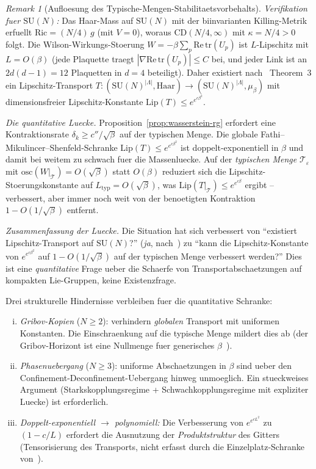 \documentclass[12pt,a4paper]{article}
\theoremstyle{definition}
\theoremstyle{plain}
\theoremstyle{remark}
\newtheorem{remark}[definition]{Remark}
\begin{document}
\begin{remark}[Aufloesung des Typische-Mengen-Stabilitaetsvorbehalts]
\emph{Verifikation fuer $\mathrm{SU}(N)$:}
Das Haar-Mass auf $\mathrm{SU}(N)$ mit der biinvarianten Killing-Metrik
erfuellt $\mathrm{Ric} = (N/4)\,g$ (mit $V = 0$),
woraus $\mathrm{CD}(N/4, \infty)$ mit $\kappa = N/4 > 0$ folgt.
Die Wilson-Wirkungs-Stoerung $W = -\beta\sum_p \mathrm{Re}\,\mathrm{tr}(U_p)$
ist $L$-Lipschitz mit $L = O(\beta)$ (jede Plaquette traegt
$|\nabla \mathrm{Re}\,\mathrm{tr}(U_p)| \leq C$ bei, und jeder Link
ist an $2d(d-1) = 12$ Plaquetten in $d=4$ beteiligt).
Daher existiert nach~\cite{FathiMikulincerShenfeld2024} Theorem~3
ein Lipschitz-Transport $T: (\mathrm{SU}(N)^{|\Lambda|}, \text{Haar})
\to (\mathrm{SU}(N)^{|\Lambda|}, \mu_\beta)$ mit
dimensionsfreier Lipschitz-Konstante $\mathrm{Lip}(T) \leq e^{e^{c\beta^2}}$.

\emph{Die quantitative Luecke.}
Proposition~\ref{prop:wasserstein-rg} erfordert eine Kontraktionsrate
$\delta_k \geq c''/\sqrt{\beta}$ auf der typischen Menge.  Die globale
Fathi--Mikulincer--Shenfeld-Schranke $\mathrm{Lip}(T) \leq e^{e^{c\beta^2}}$
ist doppelt-exponentiell in $\beta$ und damit bei weitem zu schwach fuer die Massenluecke.
Auf der \emph{typischen Menge} $\mathcal{T}_\varepsilon$ mit
$\mathrm{osc}(W|_{\mathcal{T}}) = O(\sqrt{\beta})$ statt $O(\beta)$
reduziert sich die Lipschitz-Stoerungskonstante auf $L_{\mathrm{typ}} = O(\sqrt{\beta})$,
was $\mathrm{Lip}(T|_{\mathcal{T}}) \leq e^{e^{c\beta}}$ ergibt -- verbessert,
aber immer noch weit von der benoetigten Kontraktion $1 - O(1/\sqrt{\beta})$ entfernt.

\emph{Zusammenfassung der Luecke.}
Die Situation hat sich verbessert von ``existiert Lipschitz-Transport auf
$\mathrm{SU}(N)$?'' (\emph{ja}, nach~\cite{FathiMikulincerShenfeld2024})
zu ``kann die Lipschitz-Konstante von
$e^{e^{c\beta^2}}$ auf $1 - O(1/\sqrt{\beta})$ auf der typischen Menge verbessert werden?''
Dies ist eine \emph{quantitative} Frage ueber die Schaerfe von
Transportabschaetzungen auf kompakten Lie-Gruppen, keine Existenzfrage.

Drei strukturelle Hindernisse verbleiben fuer die quantitative Schranke:
\begin{enumerate}[(i)]
\item \emph{Gribov-Kopien} ($N \geq 2$):
  verhindern \emph{globalen} Transport mit uniformen Konstanten.
  Die Einschraenkung auf die typische Menge mildert dies ab
  (der Gribov-Horizont ist eine Nullmenge fuer
  generisches $\beta$~\cite{Zwanziger1989}).
\item \emph{Phasenuebergang} ($N \geq 3$):
  uniforme Abschaetzungen in $\beta$ sind ueber den
  Confinement-Deconfinement-Uebergang hinweg unmoeglich.
  Ein stueckweises Argument (Starkskopplungsregime + Schwachkopplungsregime
  mit expliziter Luecke) ist erforderlich.
\item \emph{Doppelt-exponentiell $\to$ polynomiell:}
  Die Verbesserung von $e^{e^{c L^2}}$ zu $(1 - c/L)$ erfordert
  die Ausnutzung der \emph{Produktstruktur} des Gitters
  (Tensorisierung des Transports, nicht erfasst durch die Einzelplatz-Schranke
  von~\cite{FathiMikulincerShenfeld2024}).
\end{enumerate}


\end{remark}
\end{document}
